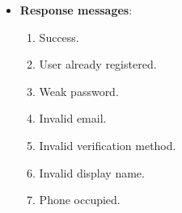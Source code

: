 \begin{itemize}
\begin{itemize}
        \begin{spverbatim}
        {
            "errorMessage": "string",
            "errorDetails": "string",
            "statusCode": 0,
            "success": true
        }
        \end{spverbatim}
        \item \textbf{Response messages}:
        \begin{enumerate}
            \item Success.
            \item User already registered.
            \item Weak password.
            \item Invalid email.
            \item Invalid verification method.
            \item Invalid display name.
            \item Phone occupied.
        \end{enumerate}
    \end{itemize}


\end{itemize}
